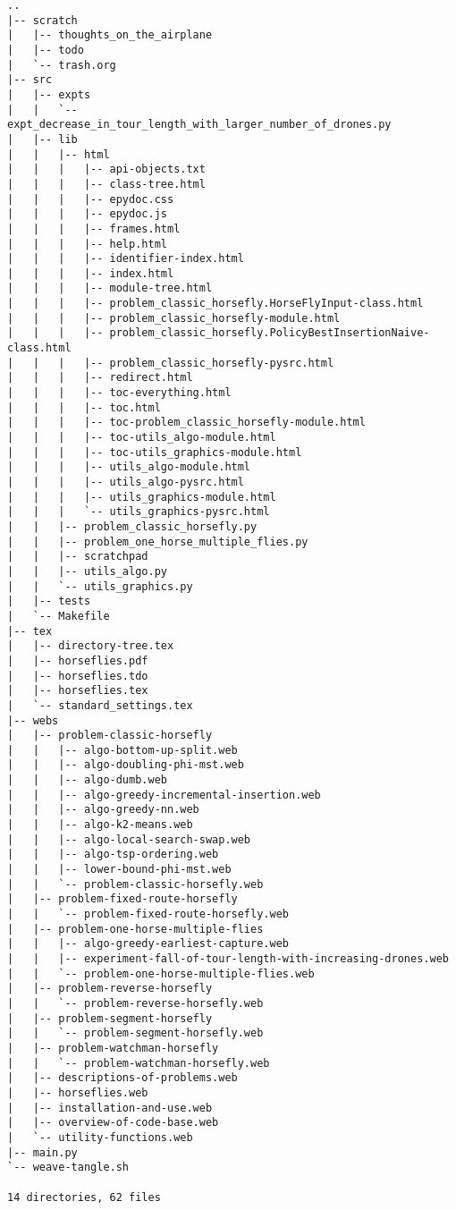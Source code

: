 \begin{verbatim}
..
|-- scratch
|   |-- thoughts_on_the_airplane
|   |-- todo
|   `-- trash.org
|-- src
|   |-- expts
|   |   `-- expt_decrease_in_tour_length_with_larger_number_of_drones.py
|   |-- lib
|   |   |-- html
|   |   |   |-- api-objects.txt
|   |   |   |-- class-tree.html
|   |   |   |-- epydoc.css
|   |   |   |-- epydoc.js
|   |   |   |-- frames.html
|   |   |   |-- help.html
|   |   |   |-- identifier-index.html
|   |   |   |-- index.html
|   |   |   |-- module-tree.html
|   |   |   |-- problem_classic_horsefly.HorseFlyInput-class.html
|   |   |   |-- problem_classic_horsefly-module.html
|   |   |   |-- problem_classic_horsefly.PolicyBestInsertionNaive-class.html
|   |   |   |-- problem_classic_horsefly-pysrc.html
|   |   |   |-- redirect.html
|   |   |   |-- toc-everything.html
|   |   |   |-- toc.html
|   |   |   |-- toc-problem_classic_horsefly-module.html
|   |   |   |-- toc-utils_algo-module.html
|   |   |   |-- toc-utils_graphics-module.html
|   |   |   |-- utils_algo-module.html
|   |   |   |-- utils_algo-pysrc.html
|   |   |   |-- utils_graphics-module.html
|   |   |   `-- utils_graphics-pysrc.html
|   |   |-- problem_classic_horsefly.py
|   |   |-- problem_one_horse_multiple_flies.py
|   |   |-- scratchpad
|   |   |-- utils_algo.py
|   |   `-- utils_graphics.py
|   |-- tests
|   `-- Makefile
|-- tex
|   |-- directory-tree.tex
|   |-- horseflies.pdf
|   |-- horseflies.tdo
|   |-- horseflies.tex
|   `-- standard_settings.tex
|-- webs
|   |-- problem-classic-horsefly
|   |   |-- algo-bottom-up-split.web
|   |   |-- algo-doubling-phi-mst.web
|   |   |-- algo-dumb.web
|   |   |-- algo-greedy-incremental-insertion.web
|   |   |-- algo-greedy-nn.web
|   |   |-- algo-k2-means.web
|   |   |-- algo-local-search-swap.web
|   |   |-- algo-tsp-ordering.web
|   |   |-- lower-bound-phi-mst.web
|   |   `-- problem-classic-horsefly.web
|   |-- problem-fixed-route-horsefly
|   |   `-- problem-fixed-route-horsefly.web
|   |-- problem-one-horse-multiple-flies
|   |   |-- algo-greedy-earliest-capture.web
|   |   |-- experiment-fall-of-tour-length-with-increasing-drones.web
|   |   `-- problem-one-horse-multiple-flies.web
|   |-- problem-reverse-horsefly
|   |   `-- problem-reverse-horsefly.web
|   |-- problem-segment-horsefly
|   |   `-- problem-segment-horsefly.web
|   |-- problem-watchman-horsefly
|   |   `-- problem-watchman-horsefly.web
|   |-- descriptions-of-problems.web
|   |-- horseflies.web
|   |-- installation-and-use.web
|   |-- overview-of-code-base.web
|   `-- utility-functions.web
|-- main.py
`-- weave-tangle.sh

14 directories, 62 files
\end{verbatim}
